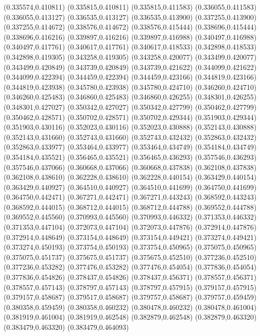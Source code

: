 (0.335574,0.410811)
(0.335815,0.410811)
(0.335815,0.411583)
(0.336055,0.411583)
(0.336055,0.413127)
(0.336535,0.413127)
(0.336535,0.413900)
(0.337255,0.413900)
(0.337255,0.414672)
(0.338576,0.414672)
(0.338576,0.415444)
(0.338696,0.415444)
(0.338696,0.416216)
(0.339897,0.416216)
(0.339897,0.416988)
(0.340497,0.416988)
(0.340497,0.417761)
(0.340617,0.417761)
(0.340617,0.418533)
(0.342898,0.418533)
(0.342898,0.419305)
(0.343258,0.419305)
(0.343258,0.420077)
(0.343499,0.420077)
(0.343499,0.420849)
(0.343739,0.420849)
(0.343739,0.421622)
(0.344099,0.421622)
(0.344099,0.422394)
(0.344459,0.422394)
(0.344459,0.423166)
(0.344819,0.423166)
(0.344819,0.423938)
(0.345780,0.423938)
(0.345780,0.424710)
(0.346260,0.424710)
(0.346260,0.425483)
(0.346860,0.425483)
(0.346860,0.426255)
(0.348301,0.426255)
(0.348301,0.427027)
(0.350342,0.427027)
(0.350342,0.427799)
(0.350462,0.427799)
(0.350462,0.428571)
(0.350702,0.428571)
(0.350702,0.429344)
(0.351903,0.429344)
(0.351903,0.430116)
(0.352023,0.430116)
(0.352023,0.430888)
(0.352143,0.430888)
(0.352143,0.431660)
(0.352743,0.431660)
(0.352743,0.432432)
(0.352863,0.432432)
(0.352863,0.433977)
(0.353464,0.433977)
(0.353464,0.434749)
(0.354184,0.434749)
(0.354184,0.435521)
(0.356465,0.435521)
(0.356465,0.436293)
(0.357546,0.436293)
(0.357546,0.437066)
(0.360668,0.437066)
(0.360668,0.437838)
(0.362108,0.437838)
(0.362108,0.438610)
(0.362228,0.438610)
(0.362228,0.440154)
(0.363429,0.440154)
(0.363429,0.440927)
(0.364510,0.440927)
(0.364510,0.441699)
(0.364750,0.441699)
(0.364750,0.442471)
(0.367271,0.442471)
(0.367271,0.443243)
(0.368592,0.443243)
(0.368592,0.444015)
(0.368712,0.444015)
(0.368712,0.444788)
(0.369552,0.444788)
(0.369552,0.445560)
(0.370993,0.445560)
(0.370993,0.446332)
(0.371353,0.446332)
(0.371353,0.447104)
(0.372073,0.447104)
(0.372073,0.447876)
(0.372914,0.447876)
(0.372914,0.448649)
(0.373154,0.448649)
(0.373154,0.449421)
(0.373274,0.449421)
(0.373274,0.450193)
(0.373754,0.450193)
(0.373754,0.450965)
(0.375075,0.450965)
(0.375075,0.451737)
(0.375675,0.451737)
(0.375675,0.452510)
(0.377236,0.452510)
(0.377236,0.453282)
(0.377476,0.453282)
(0.377476,0.454054)
(0.377836,0.454054)
(0.377836,0.454826)
(0.378437,0.454826)
(0.378437,0.456371)
(0.378557,0.456371)
(0.378557,0.457143)
(0.378797,0.457143)
(0.378797,0.457915)
(0.379157,0.457915)
(0.379157,0.458687)
(0.379517,0.458687)
(0.379757,0.458687)
(0.379757,0.459459)
(0.380358,0.459459)
(0.380358,0.460232)
(0.380478,0.460232)
(0.380478,0.461004)
(0.381919,0.461004)
(0.381919,0.462548)
(0.382879,0.462548)
(0.382879,0.463320)
(0.383479,0.463320)
(0.383479,0.464093)
